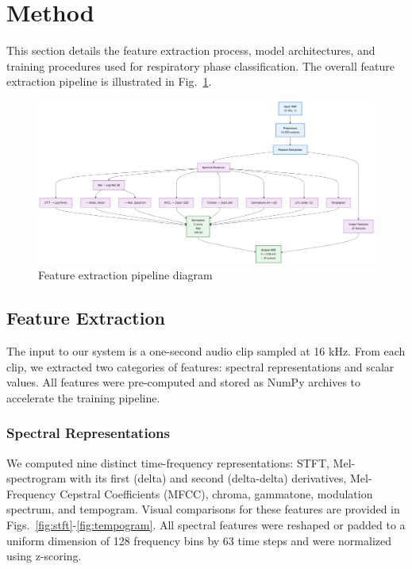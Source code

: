 \section{Method}

This section details the feature extraction process, model architectures, and training procedures used for respiratory phase classification. The overall feature extraction pipeline is illustrated in Fig.~\ref{fig:feat_ext_diagram}.


\begin{figure}[h!]
\centering
\includegraphics[width=\columnwidth]{figures/feature_extraction}	
\caption{Feature extraction pipeline diagram}
\label{fig:feat_ext_diagram}
\end{figure}

\subsection{Feature Extraction}

The input to our system is a one-second audio clip sampled at 16 kHz. From each clip, we extracted two categories of features: spectral representations and scalar values. All features were pre-computed and stored as NumPy archives to accelerate the training pipeline.

\subsubsection{Spectral Representations}

We computed nine distinct time-frequency representations: STFT, Mel-spectrogram with its first (delta) and second (delta-delta) derivatives, Mel-Frequency Cepstral Coefficients (MFCC), chroma, gammatone, modulation spectrum, and tempogram. Visual comparisons for these features are provided in Figs.~\ref{fig:stft}-\ref{fig:tempogram}. All spectral features were reshaped or padded to a uniform dimension of 128 frequency bins by 63 time steps and were normalized using z-scoring.

